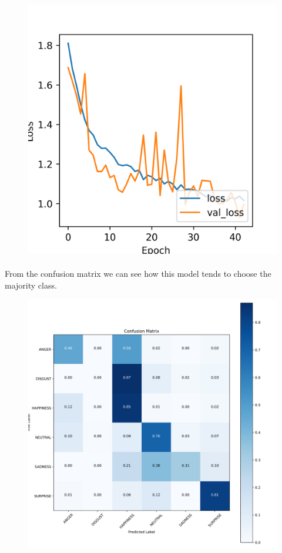 \begin{figure}[H]
	\centering
	\includegraphics[width=.5\textwidth]{assets/results/preMELD.scratch/model.2dense.aug/learning_history-loss.png}
	
	\label{fig:figure9}
\end{figure}

\paragraph{}
From the confusion matrix we can see how this model tends to choose the majority class.

\begin{figure}[H]
	\centering
	\includegraphics[width=.95\textwidth]{assets/results/preMELD.scratch/model.2dense.aug/confusion_matrix.png}
	
	\label{fig:cm4}
\end{figure}







